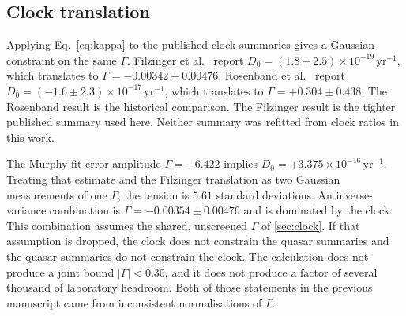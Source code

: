 \subsection{Clock translation}
\label{sec:clock-result}

Applying Eq.~\eqref{eq:kappa} to the published clock summaries gives a Gaussian constraint on the same $\Gamma$.
Filzinger et al.~\citep{Filzinger2023} report $D_{0}=(1.8\pm2.5)\times10^{-19}\,\mathrm{yr}^{-1}$, which translates to $\Gamma=-0.00342\pm0.00476$.
Rosenband et al.~\citep{Rosenband2008} report $D_{0}=(-1.6\pm2.3)\times10^{-17}\,\mathrm{yr}^{-1}$, which translates to $\Gamma=+0.304\pm0.438$.
The Rosenband result is the historical comparison.
The Filzinger result is the tighter published summary used here.
Neither summary was refitted from clock ratios in this work.

The Murphy fit-error amplitude $\Gamma=-6.422$ implies $D_{0}=+3.375\times10^{-16}\,\mathrm{yr}^{-1}$.
Treating that estimate and the Filzinger translation as two Gaussian measurements of one $\Gamma$, the tension is $5.61$ standard deviations.
An inverse-variance combination is $\Gamma=-0.00354\pm0.00476$ and is dominated by the clock.
This combination assumes the shared, unscreened $\Gamma$ of \cref{sec:clock}.
If that assumption is dropped, the clock does not constrain the quasar summaries and the quasar summaries do not constrain the clock.
The calculation does not produce a joint bound $|\Gamma|<0.30$, and it does not produce a factor of several thousand of laboratory headroom.
Both of those statements in the previous manuscript came from inconsistent normalisations of $\Gamma$.
